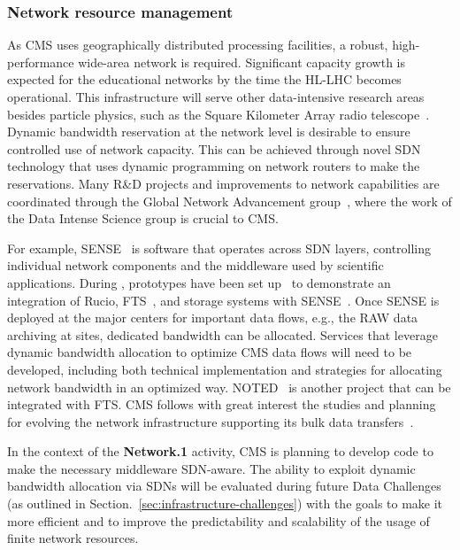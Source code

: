 \subsubsection{Network resource management}

As CMS uses geographically distributed processing facilities, a robust, high-performance wide-area network is required. Significant capacity growth is expected for the educational networks by the time the \gls{HL-LHC} becomes operational. This infrastructure will serve other data-intensive research areas besides particle physics, such as the Square Kilometer Array radio telescope~\cite{ska_observatory_2021_16896182}. Dynamic bandwidth reservation at the network level is desirable to ensure controlled use of network capacity. This can be achieved through novel \gls{SDN} technology that uses dynamic programming on network routers to make the reservations. Many R\&D projects and improvements to network capabilities are coordinated through the Global Network Advancement group~\cite{gna-g.net}, where the work of the Data Intense Science group is crucial to CMS.

For example, \gls{SENSE}~\cite{Monga_2020} is software that operates across \gls{SDN} layers, controlling individual network components and the middleware used by scientific applications. During \RunThree, prototypes have been set up~\cite{Wurthwein:2022auh} to demonstrate an integration of Rucio, \gls{FTS}~\cite{Ayllon:2014wca}, and storage systems with \gls{SENSE}~\cite{sense-rucio}. Once \gls{SENSE} is deployed at the major centers for important data flows, e.g., the \gls{RAW} data archiving at \TierOne sites, dedicated bandwidth can be allocated. Services that leverage dynamic bandwidth allocation to optimize CMS data flows will need to be developed, including both technical implementation and strategies for allocating network bandwidth in an optimized way. \gls{NOTED}~\cite{NOTED} is another project that can be integrated with \gls{FTS}. CMS follows with great interest the studies and planning for evolving the network infrastructure supporting its bulk data transfers~\cite{Martelli_2015}.

In the context of the \textbf{Network.1} activity, CMS is planning to develop code to make the necessary middleware \gls{SDN}-aware. The ability to exploit dynamic bandwidth allocation via \glspl{SDN} will be evaluated during future Data Challenges (as outlined in Section.~\ref{sec:infrastructure-challenges}) with the goals to make it more efficient and to improve the predictability and scalability of the usage of finite network resources.

